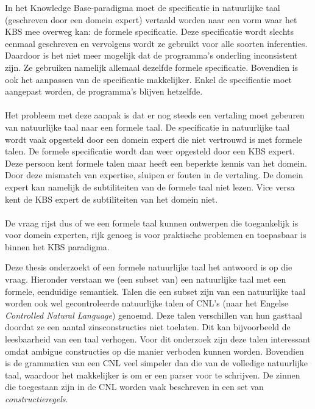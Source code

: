 In het Knowledge Base-paradigma moet de specificatie in natuurlijke taal (geschreven door een domein expert) vertaald worden naar een vorm waar het KBS mee overweg kan: de formele specificatie. Deze specificatie wordt slechts eenmaal geschreven en vervolgens wordt ze gebruikt voor alle soorten inferenties. Daardoor is het niet meer mogelijk dat de programma's onderling inconsistent zijn. Ze gebruiken namelijk allemaal dezelfde formele specificatie. Bovendien is ook het aanpassen van de specificatie makkelijker. Enkel de specificatie moet aangepast worden, de programma's blijven hetzelfde.

\paragraph{} Het probleem met deze aanpak is dat er nog steeds een vertaling moet gebeuren van natuurlijke taal naar een formele taal. De specificatie in natuurlijke taal wordt vaak opgesteld door een domein expert die niet vertrouwd is met formele talen. De formele specificatie wordt dan weer opgesteld door een KBS expert. Deze persoon kent formele talen maar heeft een beperkte kennis van het domein. Door deze mismatch van expertise, sluipen er fouten in de vertaling. De domein expert kan namelijk de subtiliteiten van de formele taal niet lezen. Vice versa kent de KBS expert de subtiliteiten van het domein niet.

\paragraph{} De vraag rijst dus of we een formele taal kunnen ontwerpen die toegankelijk is voor domein experten, rijk genoeg is voor praktische problemen en toepasbaar is binnen het KBS paradigma.

Deze thesis onderzoekt of een formele natuurlijke taal het antwoord is op die vraag. Hieronder verstaan we (een subset van) een natuurlijke taal met een formele, eenduidige semantiek. Talen die een subset zijn van een natuurlijke taal worden ook wel gecontroleerde natuurlijke talen of CNL's (naar het Engelse \textit{Controlled Natural Language}) genoemd. Deze talen verschillen van hun gasttaal doordat ze een aantal zinsconstructies niet toelaten. Dit kan bijvoorbeeld de leesbaarheid van een taal verhogen. Voor dit onderzoek zijn deze talen interessant omdat ambigue constructies op die manier verboden kunnen worden. Bovendien is de grammatica van een CNL veel simpeler dan die van de volledige natuurlijke taal, waardoor het makkelijker is om er een parser voor te schrijven. De zinnen die toegestaan zijn in de CNL worden vaak beschreven in een set van \textit{constructieregels}.

